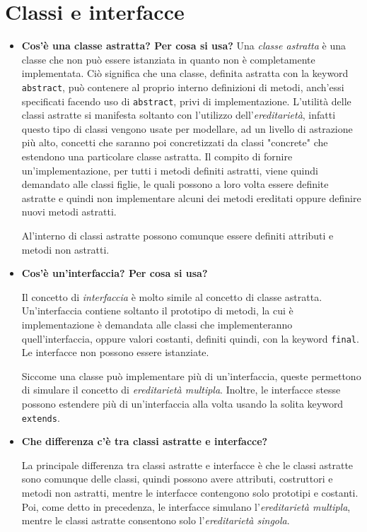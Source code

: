\documentclass[12pt, a4paper]{article}
\begin{document}
\section{Classi e interfacce}
\begin{itemize}
    \item \textbf{Cos'è una classe astratta? Per cosa si usa?}
    Una \emph{classe astratta} è una classe che non può essere istanziata in quanto
    non è completamente implementata. Ciò significa che una classe, definita astratta
    con la keyword \texttt{abstract}, può contenere al proprio interno definizioni
    di metodi, anch'essi specificati facendo uso di \texttt{abstract}, privi
    di implementazione. L'utilità delle classi astratte si manifesta soltanto con
    l'utilizzo dell'\emph{ereditarietà}, infatti questo tipo di classi vengono usate
    per modellare, ad un livello di astrazione più alto, concetti che saranno poi
    concretizzati da classi "concrete" che estendono una particolare classe astratta.
    Il compito di fornire un'implementazione, per tutti i metodi definiti astratti, viene
    quindi demandato alle classi figlie, le quali possono a loro volta essere definite
    astratte e quindi non implementare alcuni dei metodi ereditati oppure definire
    nuovi metodi astratti.

    Al'interno di classi astratte possono comunque essere definiti attributi e metodi
    non astratti.

    \item \textbf{Cos'è un'interfaccia? Per cosa si usa?}
    
    Il concetto di \emph{interfaccia} è molto simile al concetto di classe astratta.
    Un'interfaccia contiene soltanto il prototipo di metodi, la cui è implementazione
    è demandata alle classi che implementeranno quell'interfaccia, oppure valori
    costanti, definiti quindi, con la keyword \texttt{final}. Le interfacce non
    possono essere istanziate.

    Siccome una classe può implementare più di un'interfaccia, queste permettono di
    simulare il concetto di \emph{ereditarietà multipla}. Inoltre, le interfacce
    stesse possono estendere più di un'interfaccia alla volta usando la solita
    keyword \texttt{extends}.
    \item \textbf{Che differenza c'è tra classi astratte e interfacce?}
    
    La principale differenza tra classi astratte e interfacce è che le classi astratte
    sono comunque delle classi, quindi possono avere attributi, costruttori e metodi
    non astratti, mentre le interfacce contengono solo prototipi e costanti.
    Poi, come detto in precedenza, le interfacce simulano l'\emph{ereditarietà multipla},
    mentre le classi astratte consentono solo l'\emph{ereditarietà singola}.
\end{itemize}
\end{document}
